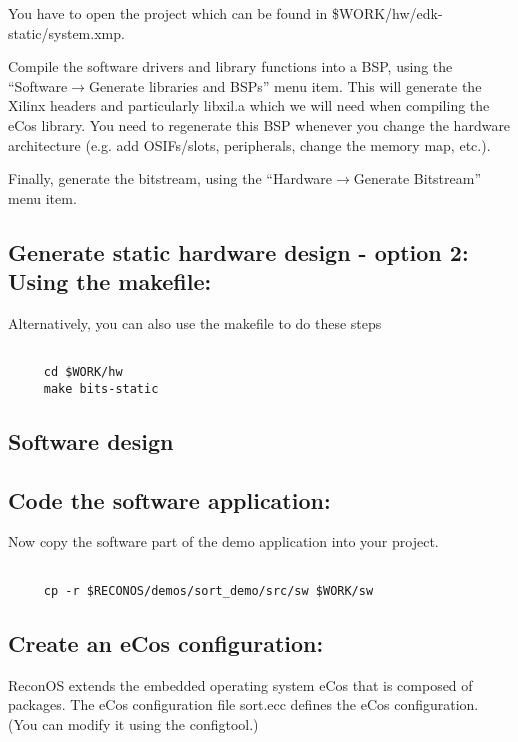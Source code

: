 \documentclass[DIV15,a4paper]{scrartcl}
\begin{document}
You have to open the project which can be found in \$WORK/hw/edk-static/system.xmp.

Compile the software drivers and library functions into a BSP, using the ``Software$\rightarrow$Generate libraries and BSPs'' menu item. 
This will generate the Xilinx headers and particularly libxil.a which we will need when compiling the eCos library. 
You need to regenerate this BSP whenever you change the hardware architecture (e.g. add OSIFs/slots, peripherals, change the memory map, etc.).

Finally, generate the bitstream, using the ``Hardware$\rightarrow$Generate Bitstream'' menu item.

\subsection*{Generate static hardware design - option 2: Using the makefile:}

Alternatively, you can also use the makefile to do these steps

\begin{verbatim}

     cd $WORK/hw
     make bits-static

\end{verbatim}
     
     
\subsection{Software design}

\subsection*{Code the software application:}

Now copy the software part of the demo application into your project.

\begin{verbatim}

     cp -r $RECONOS/demos/sort_demo/src/sw $WORK/sw

\end{verbatim}
     
\subsection*{Create an eCos configuration:}

ReconOS extends the embedded operating system eCos that is composed of packages. The eCos configuration file sort.ecc
defines the eCos configuration. (You can modify it using the configtool.)
\end{document}
